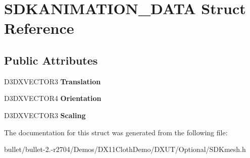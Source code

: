 \hypertarget{struct_s_d_k_a_n_i_m_a_t_i_o_n___d_a_t_a}{\section{S\+D\+K\+A\+N\+I\+M\+A\+T\+I\+O\+N\+\_\+\+D\+A\+T\+A Struct Reference}
\label{struct_s_d_k_a_n_i_m_a_t_i_o_n___d_a_t_a}
}
\subsection*{Public Attributes}
\begin{DoxyCompactItemize}
\item 
\hypertarget{struct_s_d_k_a_n_i_m_a_t_i_o_n___d_a_t_a_adad4b0ac15283c48824eb5941e655fb1}{D3\+D\+X\+V\+E\+C\+T\+O\+R3 {\bfseries Translation}}\label{struct_s_d_k_a_n_i_m_a_t_i_o_n___d_a_t_a_adad4b0ac15283c48824eb5941e655fb1}

\item 
\hypertarget{struct_s_d_k_a_n_i_m_a_t_i_o_n___d_a_t_a_a28e6f60beced06e0f660996ae46219e5}{D3\+D\+X\+V\+E\+C\+T\+O\+R4 {\bfseries Orientation}}\label{struct_s_d_k_a_n_i_m_a_t_i_o_n___d_a_t_a_a28e6f60beced06e0f660996ae46219e5}

\item 
\hypertarget{struct_s_d_k_a_n_i_m_a_t_i_o_n___d_a_t_a_ad6fa0a709c1147ed93542a2ae584ba27}{D3\+D\+X\+V\+E\+C\+T\+O\+R3 {\bfseries Scaling}}\label{struct_s_d_k_a_n_i_m_a_t_i_o_n___d_a_t_a_ad6fa0a709c1147ed93542a2ae584ba27}

\end{DoxyCompactItemize}


The documentation for this struct was generated from the following file\+:\begin{DoxyCompactItemize}
\item 
bullet/bullet-\/2.-\/r2704/\+Demos/\+D\+X11\+Cloth\+Demo/\+D\+X\+U\+T/\+Optional/S\+D\+Kmesh.\+h\end{DoxyCompactItemize}

